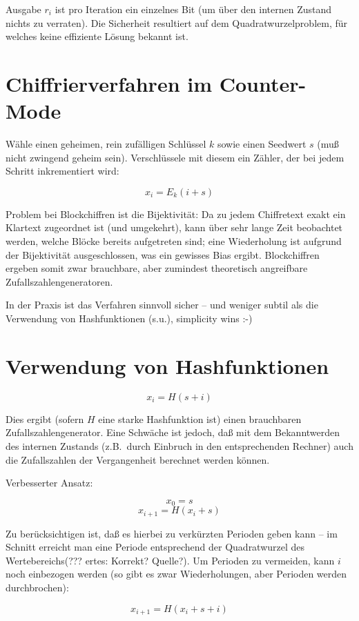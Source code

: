 Ausgabe $r_i$ ist pro Iteration ein einzelnes Bit (um über den internen Zustand nichts zu verraten). Die Sicherheit resultiert auf dem Quadratwurzelproblem, für welches keine effiziente Lösung bekannt ist.

\section{Chiffrierverfahren im Counter-Mode}

Wähle einen geheimen, rein zufälligen Schlüssel $k$ sowie einen Seedwert $s$ (muß nicht zwingend geheim sein). Verschlüssele mit diesem ein Zähler, der bei jedem Schritt inkrementiert wird:

$$x_i = E_k(i+s)$$

Problem bei Blockchiffren ist die Bijektivität: Da zu jedem Chiffretext exakt ein Klartext zugeordnet ist (und umgekehrt), kann über sehr lange Zeit beobachtet werden, welche Blöcke bereits aufgetreten sind; eine Wiederholung ist aufgrund der Bijektivität ausgeschlossen, was ein gewisses Bias ergibt. Blockchiffren ergeben somit zwar brauchbare, aber zumindest theoretisch angreifbare Zufallszahlengeneratoren.

In der Praxis ist das Verfahren sinnvoll sicher -- und weniger subtil als die Verwendung von Hashfunktionen (s.u.), simplicity wins :-)

\section{Verwendung von Hashfunktionen}

$$x_i = H(s+i) $$

Dies ergibt (sofern $H$ eine starke Hashfunktion ist) einen brauchbaren Zufallszahlengenerator. Eine Schwäche ist jedoch, daß mit dem Bekanntwerden des internen Zustands (z.B.~durch Einbruch in den entsprechenden Rechner) auch die Zufallszahlen der Vergangenheit berechnet werden können.

Verbesserter Ansatz:

$$x_0 = s$$
$$x_{i+1} = H(x_i + s)$$

Zu berücksichtigen ist, daß es hierbei zu verkürzten Perioden geben kann -- im Schnitt erreicht man eine Periode entsprechend der Quadratwurzel des Wertebereichs(??? ertes: Korrekt? Quelle?). Um Perioden zu vermeiden, kann $i$ noch einbezogen werden (so gibt es zwar Wiederholungen, aber Perioden werden durchbrochen):

$$x_{i+1} = H(x_i + s + i)$$

